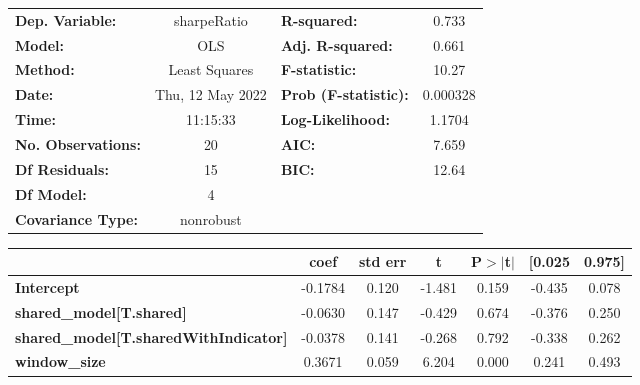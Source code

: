 \begin{center}
\begin{tabular}{lclc}
\toprule
\textbf{Dep. Variable:}                       &   sharpeRatio    & \textbf{  R-squared:         } &     0.733   \\
\textbf{Model:}                               &       OLS        & \textbf{  Adj. R-squared:    } &     0.661   \\
\textbf{Method:}                              &  Least Squares   & \textbf{  F-statistic:       } &     10.27   \\
\textbf{Date:}                                & Thu, 12 May 2022 & \textbf{  Prob (F-statistic):} &  0.000328   \\
\textbf{Time:}                                &     11:15:33     & \textbf{  Log-Likelihood:    } &    1.1704   \\
\textbf{No. Observations:}                    &          20      & \textbf{  AIC:               } &     7.659   \\
\textbf{Df Residuals:}                        &          15      & \textbf{  BIC:               } &     12.64   \\
\textbf{Df Model:}                            &           4      & \textbf{                     } &             \\
\textbf{Covariance Type:}                     &    nonrobust     & \textbf{                     } &             \\
\bottomrule
\end{tabular}
\begin{tabular}{lcccccc}
                                              & \textbf{coef} & \textbf{std err} & \textbf{t} & \textbf{P$> |$t$|$} & \textbf{[0.025} & \textbf{0.975]}  \\
\midrule
\textbf{Intercept}                            &      -0.1784  &        0.120     &    -1.481  &         0.159        &       -0.435    &        0.078     \\
\textbf{shared\_model[T.shared]}              &      -0.0630  &        0.147     &    -0.429  &         0.674        &       -0.376    &        0.250     \\
\textbf{shared\_model[T.sharedWithIndicator]} &      -0.0378  &        0.141     &    -0.268  &         0.792        &       -0.338    &        0.262     \\
\textbf{window\_size}                         &       0.3671  &        0.059     &     6.204  &         0.000        &        0.241    &        0.493     \\

\end{tabular}
\end{center}

